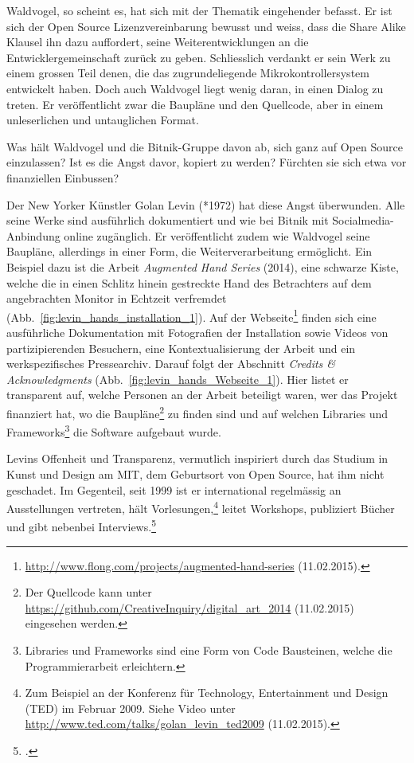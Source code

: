 \documentclass[
paper=164mm:234mm, %
pagesize, %
DIV=calc, %
10pt, %
parskip=half- %
]{scrbook}
\begin{document}
Waldvogel, so scheint es, hat sich mit der Thematik eingehender befasst. Er ist sich der Open Source Lizenzvereinbarung bewusst und weiss, dass die Share Alike Klausel ihn dazu auffordert, seine Weiterentwicklungen an die Entwicklergemeinschaft zurück zu geben. Schliesslich verdankt er sein Werk zu einem grossen Teil denen, die das zugrundeliegende Mikrokontrollersystem entwickelt haben. Doch auch Waldvogel liegt wenig daran, in einen Dialog zu treten. Er veröffentlicht zwar die Baupläne und den Quellcode, aber in einem unleserlichen und untauglichen Format.

Was hält Waldvogel und die Bitnik-Gruppe davon ab, sich ganz auf Open Source einzulassen? Ist es die Angst davor, kopiert zu werden? Fürchten sie sich etwa vor finanziellen Einbussen?

Der New Yorker Künstler Golan Levin (*1972) hat diese Angst überwunden. Alle seine Werke sind ausführlich dokumentiert und wie bei Bitnik mit Socialmedia-Anbindung online zugänglich. Er veröffentlicht zudem wie Waldvogel seine Baupläne, allerdings in einer Form, die Weiterverarbeitung ermöglicht. Ein Beispiel dazu ist die Arbeit \emph{Augmented Hand Series} (2014), eine schwarze Kiste, welche die in einen Schlitz hinein gestreckte Hand des Betrachters auf dem angebrachten Monitor in Echtzeit verfremdet (Abb.~\ref{fig:levin_hands_installation_1}). Auf der Webseite\footnote{\url{http://www.flong.com/projects/augmented-hand-series} (11.02.2015).} finden sich eine ausführliche Dokumentation mit Fotografien der Installation sowie Videos von partizipierenden Besuchern, eine Kontextualisierung der Arbeit und ein werkspezifisches Pressearchiv. Darauf folgt der Abschnitt \emph{Credits \& Acknowledgments} (Abb.~\ref{fig:levin_hands_Webseite_1}). Hier listet er transparent auf, welche Personen an der Arbeit beteiligt waren, wer das Projekt finanziert hat, wo die Baupläne\footnote{Der Quellcode kann unter \url{https://github.com/CreativeInquiry/digital_art_2014} (11.02.2015) eingesehen werden.} zu finden sind und auf welchen Libraries und Frameworks\footnote{Libraries und Frameworks sind eine Form von Code Bausteinen, welche die Programmierarbeit erleichtern.} die Software aufgebaut wurde.

Levins Offenheit und Transparenz, vermutlich inspiriert durch das Studium in Kunst und Design am MIT, dem Geburtsort von Open Source, hat ihm nicht geschadet. Im Gegenteil, seit 1999 ist er international regelmässig an Ausstellungen vertreten, hält Vorlesungen,\footnote{Zum Beispiel an der Konferenz für Technology, Entertainment und Design (TED) im Februar 2009. Siehe Video unter \url{http://www.ted.com/talks/golan_levin_ted2009} (11.02.2015).} leitet Workshops, publiziert Bücher und gibt nebenbei Interviews.\footnote{\cite[144]{Hope-Ryan:2014}.}
\end{document}

